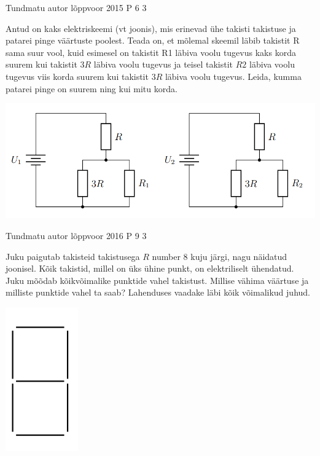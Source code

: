 \documentclass[11pt]{article}
\begin{document}
{%
{Tundmatu autor} %
{lõppvoor} %
{2015} %
{P 6} %
{3} %
{
\ifStatement
Antud on kaks elektriskeemi (vt joonis), mis erinevad ühe takisti takistuse ja patarei pinge väärtuste poolest. Teada on, et mõlemal skeemil läbib takistit R sama suur vool, kuid esimesel on takistit R1 läbiva voolu tugevus kaks korda suurem kui takistit $3R$ läbiva voolu tugevus ja teisel takistit $R2$ läbiva voolu tugevus viis korda suurem kui takistit $3R$ läbiva voolu tugevus. Leida, kumma patarei pinge on suurem ning kui mitu korda.
\begin{center}
	\includegraphics[width=0.5\linewidth]{2015-v3p-06-yl.png}
\end{center}
\fi
}

{Tundmatu autor} %
{lõppvoor} %
{2016} %
{P 9} %
{3} %
{
\ifStatement
Juku paigutab takisteid takistusega $R$ number $8$ kuju järgi, nagu näidatud joonisel. Kõik takistid, millel on üks ühine punkt, on elektriliselt ühendatud. Juku mõõdab kõikvõimalike punktide vahel takistust. Millise vähima väärtuse ja milliste punktide vahel ta saab? Lahenduses vaadake läbi kõik võimalikud juhud. 
\begin{center}
	\includegraphics[width=0.5\linewidth]{2016-v3p-09-yl.png}
\end{center}
\fi
}

}
\end{document}
